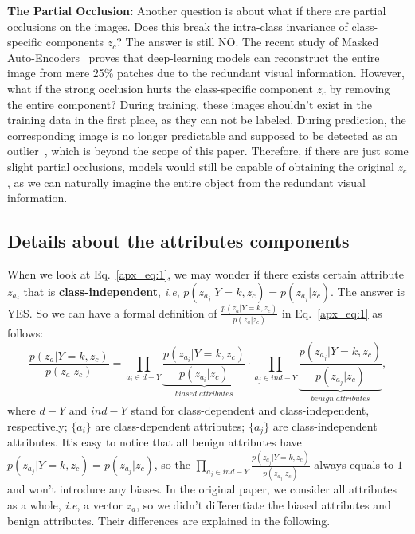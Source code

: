 \documentclass{article}
\def\ie{\emph{i.e}} \def\Ie{\emph{I.e}}
\begin{document}
\textbf{The Partial Occlusion:} Another question is about what if there are partial occlusions on the images. Does this break the intra-class invariance of class-specific components $z_c$? The answer is still NO. The recent study of Masked Auto-Encoders~\cite{MaskedAutoencoders2021} proves that deep-learning models can reconstruct the entire image from mere 25\% patches due to the redundant visual information. However, what if the strong occlusion hurts the class-specific component $z_c$ by removing the entire component? During training, these images shouldn't exist in the training data in the first place, as they can not be labeled. During prediction, the corresponding image is no longer predictable and supposed to be detected as an outlier~\cite{abdar2021review}, which is beyond the scope of this paper. Therefore, if there are just some slight partial occlusions, models would still be capable of obtaining the original $z_c$, as we can naturally imagine the entire object from the redundant visual information.






\subsection{Details about the attributes components}
When we look at Eq.~\eqref{apx_eq:1}, we may wonder if there exists certain attribute $z_{a_j}$ that is \textbf{class-independent}, \ie, $p(z_{a_j}|Y=k,z_c) = p(z_{a_j}|z_c)$. The answer is YES. So we can have a formal definition of $\frac{p(z_a|Y=k,z_c)}{p(z_a|z_c)}$ in Eq.~\eqref{apx_eq:1} as follows:
\begin{equation}
    \frac{p(z_a|Y=k,z_c)}{p(z_a|z_c)} = \prod_{a_i \in d-Y} \underbrace{\frac{p(z_{a_i}|Y=k,z_c)}{p(z_{a_i}|z_c)}}_{biased\;attributes} \cdot \prod_{a_j \in ind-Y} \underbrace{\frac{p(z_{a_j}|Y=k,z_c)}{p(z_{a_j}|z_c)}}_{benign\;attributes},
    \label{apx_eq:3}
\end{equation}
where $d-Y$ and $ind-Y$ stand for class-dependent and class-independent, respectively; $\{a_i\}$ are class-dependent attributes; $\{a_j\}$ are class-independent attributes. It's easy to notice that all benign attributes have $p(z_{a_j}|Y=k,z_c) = p(z_{a_j}|z_c)$, so the $\prod_{a_j \in ind-Y} \frac{p(z_{a_j}|Y=k,z_c)}{p(z_{a_j}|z_c)}$ always equals to $1$ and won't introduce any biases. In the original paper, we consider all attributes as a whole, \ie, a vector $z_a$, so we didn't differentiate the biased attributes and benign attributes. Their differences are explained in the following.
\end{document}
